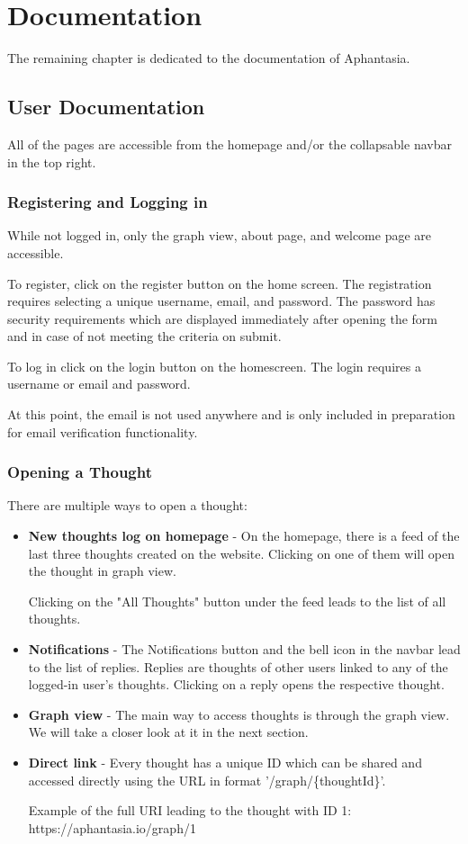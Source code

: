 \chapter{Documentation}
The remaining chapter is dedicated to the documentation of Aphantasia.

\section{User Documentation}
\label{chap:user_documentation}
All of the pages are accessible from the homepage and/or the collapsable navbar in the top right.

\subsection{Registering and Logging in}
While not logged in, only the graph view, about page, and welcome page are accessible.

To register, click on the register button on the home screen.
The registration requires selecting a unique username, email, and password.
The password has security requirements which are displayed immediately
after opening the form and in case of not meeting the criteria on submit.

To log in click on the login button on the homescreen. The login requires a username or email and password.

At this point, the email is not used anywhere and is only included in preparation for email verification functionality.

\subsection{Opening a Thought}
There are multiple ways to open a thought:
\begin{itemize}
  \item \textbf{New thoughts log on homepage} - On the homepage, there is a feed of the last three thoughts created on the website.
 Clicking on one of them will open the thought in graph view.
  
 Clicking on the "All Thoughts" button under the feed leads to the list of all thoughts.
  \item \textbf{Notifications} - The Notifications button and the bell icon in the navbar lead to the list of replies.
 Replies are thoughts of other users linked to any of the logged-in user's thoughts.
 Clicking on a reply opens the respective thought.
  \item \textbf{Graph view} - The main way to access thoughts is through the graph view. We will take a closer look at it in the next section.
  \item \textbf{Direct link} - Every thought has a unique ID which can be shared and accessed directly using the URL in format '/graph/\{thoughtId\}'.

 Example of the full URI leading to the thought with ID 1: https://aphantasia.io/graph/1
\end{itemize}

